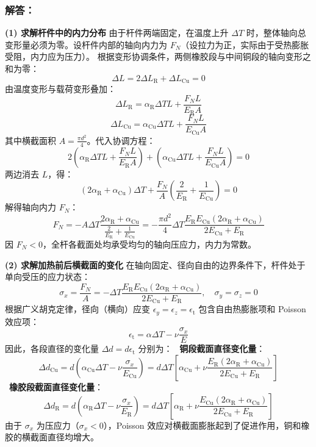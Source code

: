 \documentclass[11pt,a4paper]{ctexrep}
\begin{document}
{\subsubsection*{解答：}

\textbf{(1) 求解杆件中的内力分布}
由于杆件两端固定，在温度上升 $\Delta T$ 时，整体轴向总变形量必须为零。设杆件内部的轴向内力为 $F_N$（设拉力为正，实际由于受热膨胀受阻，内力应为压力）。
根据变形协调条件，两侧橡胶段与中间铜段的轴向变形之和为零：
\[
\Delta L = 2 \Delta L_{\mathrm{R}} + \Delta L_{\mathrm{Cu}} = 0
\]
由温度变形与载荷变形叠加：
\[
\Delta L_{\mathrm{R}} = \alpha_{\mathrm{R}} \Delta T L + \frac{F_N L}{E_{\mathrm{R}} A}
\]
\[
\Delta L_{\mathrm{Cu}} = \alpha_{\mathrm{Cu}} \Delta T L + \frac{F_N L}{E_{\mathrm{Cu}} A}
\]
其中横截面积 $A = \frac{\pi d^2}{4}$。代入协调方程：
\[
2 \left( \alpha_{\mathrm{R}} \Delta T L + \frac{F_N L}{E_{\mathrm{R}} A} \right) + \left( \alpha_{\mathrm{Cu}} \Delta T L + \frac{F_N L}{E_{\mathrm{Cu}} A} \right) = 0
\]
两边消去 $L$，得：
\[
(2 \alpha_{\mathrm{R}} + \alpha_{\mathrm{Cu}}) \Delta T + \frac{F_N}{A} \left( \frac{2}{E_{\mathrm{R}}} + \frac{1}{E_{\mathrm{Cu}}} \right) = 0
\]
解得轴向内力 $F_N$：
\[
F_N = -A \Delta T \frac{2\alpha_{\mathrm{R}} + \alpha_{\mathrm{Cu}}}{\frac{2}{E_{\mathrm{R}}} + \frac{1}{E_{\mathrm{Cu}}}} = -\frac{\pi d^2}{4} \Delta T \frac{E_{\mathrm{R}} E_{\mathrm{Cu}} (2\alpha_{\mathrm{R}} + \alpha_{\mathrm{Cu}})}{2 E_{\mathrm{Cu}} + E_{\mathrm{R}}}
\]
因 $F_N < 0$，全杆各截面处均承受均匀的轴向压应力，内力为常数。

\textbf{(2) 求解加热前后横截面的变化}
在轴向固定、径向自由的边界条件下，杆件处于单向受压的应力状态：
\[
\sigma_x = \frac{F_N}{A} = -\Delta T \frac{E_{\mathrm{R}} E_{\mathrm{Cu}} (2\alpha_{\mathrm{R}} + \alpha_{\mathrm{Cu}})}{2 E_{\mathrm{Cu}} + E_{\mathrm{R}}}, \quad \sigma_y = \sigma_z = 0
\]
根据广义胡克定律，径向（横向）应变 $\epsilon_y = \epsilon_z = \epsilon_{\mathrm{t}}$ 包含自由热膨胀项和 Poisson 效应项：
\[
\epsilon_{\mathrm{t}} = \alpha \Delta T - \nu \frac{\sigma_x}{E}
\]
因此，各段直径的变化量 $\Delta d = d \epsilon_{\mathrm{t}}$ 分别为：
\noindent\textbullet\ \textbf{铜段截面直径变化量}：
  \[
  \Delta d_{\mathrm{Cu}} = d \left( \alpha_{\mathrm{Cu}} \Delta T - \nu \frac{\sigma_x}{E_{\mathrm{Cu}}} \right) = d \Delta T \left[ \alpha_{\mathrm{Cu}} + \nu \frac{E_{\mathrm{R}} (2\alpha_{\mathrm{R}} + \alpha_{\mathrm{Cu}})}{2 E_{\mathrm{Cu}} + E_{\mathrm{R}}} \right]
  \]
\noindent\textbullet\ \textbf{橡胶段截面直径变化量}：
  \[
  \Delta d_{\mathrm{R}} = d \left( \alpha_{\mathrm{R}} \Delta T - \nu \frac{\sigma_x}{E_{\mathrm{R}}} \right) = d \Delta T \left[ \alpha_{\mathrm{R}} + \nu \frac{E_{\mathrm{Cu}} (2\alpha_{\mathrm{R}} + \alpha_{\mathrm{Cu}})}{2 E_{\mathrm{Cu}} + E_{\mathrm{R}}} \right]
  \]
由于 $\sigma_x$ 为压应力（$\sigma_x < 0$），Poisson 效应对横截面膨胀起到了促进作用，铜和橡胶的横截面直径均增大。


}
\end{document}
